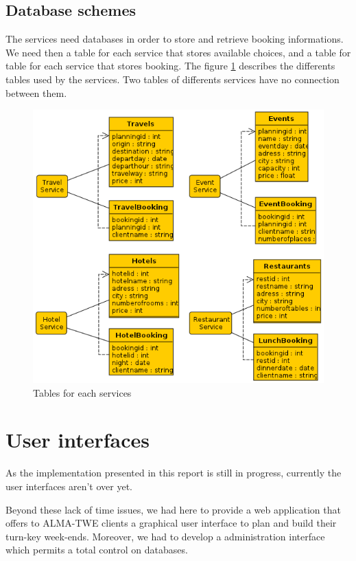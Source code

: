 \documentclass[a4paper]{article}
\begin{document}
		\subsection{Database schemes}
		
		The services need databases in order to store and retrieve booking informations. We need then a table for each service that stores available choices, and a table for table for each service that stores booking. The figure \ref{fig:globaldb} describes the differents tables used by the services. Two tables of differents services have no connection between them.
		
		\begin{figure}[htp]
			\centering
			\includegraphics[width=\textwidth]{database.png}
			\caption{Tables for each services}
			\label{fig:globaldb}
		\end{figure}
	
	
	
	\section{User interfaces}
	
		As the implementation presented in this report is still in progress, currently the user interfaces aren't over yet.
		
		Beyond these lack of time issues, we had here to provide a web application that offers to ALMA-TWE clients a graphical user interface to plan and build their turn-key week-ends.
		Moreover, we had to develop a administration interface which permits a total control on databases.
		
\end{document}
